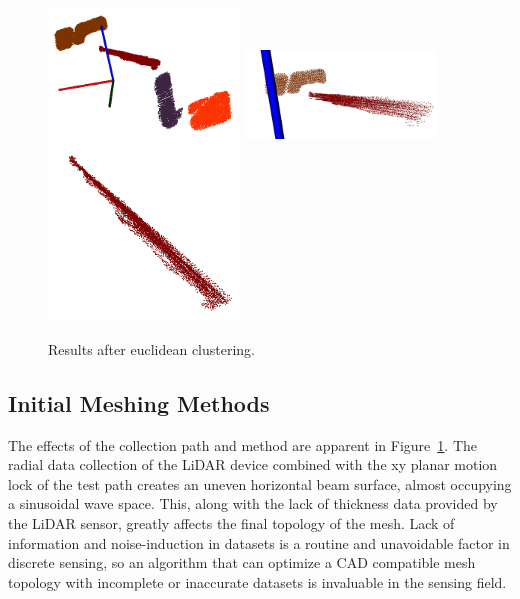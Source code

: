 \documentclass[12pt]{drexelthesis}
\let\Oldsubsection\subsection
\renewcommand{\subsection}{\FloatBarrier\Oldsubsection}
\begin{document}
\begin{figure}[!ht]
	\centering
		\includegraphics[width=2in]{images/real-lab-scans/euclidean0.png}
		\includegraphics[width=2in]{images/real-lab-scans/euclidean1.png}
		\includegraphics[width=2in]{images/real-lab-scans/euclidean2.png}
		\caption[Euclidean clustering results on HDL-32E LiDAR scans]{\centering Results after euclidean clustering.}
	\label{lidarresults:euclidean}
\end{figure}



\subsection{Initial Meshing Methods}

The effects of the collection path and method are apparent in Figure~\ref{lidarresults:euclidean}. The radial data collection of the LiDAR device combined with the xy planar motion lock of the test path creates an uneven horizontal beam surface, almost occupying a sinusoidal wave space. This, along with the lack of thickness data provided by the LiDAR sensor, greatly affects the final topology of the mesh. Lack of information and noise-induction in datasets is a routine and unavoidable factor in discrete sensing, so an algorithm that can optimize a CAD compatible mesh topology with incomplete or inaccurate datasets is invaluable in the sensing field.
\end{document}
